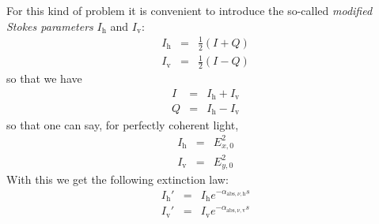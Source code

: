 \documentclass{report}
\begin{document}
For this kind of problem it is convenient to introduce the so-called {\em
  modified Stokes parameters} $I_{\mathrm{h}}$ and $I_{\mathrm{v}}$:
\begin{eqnarray}
I_{\mathrm{h}} &=& \frac{1}{2}(I+Q)\label{eq-modif-stokes-h}\\
I_{\mathrm{v}} &=& \frac{1}{2}(I-Q)\label{eq-modif-stokes-v}
\end{eqnarray}
so that we have 
\begin{eqnarray}
I &=& I_{\mathrm{h}}+I_{\mathrm{v}}\\
Q &=& I_{\mathrm{h}}-I_{\mathrm{v}}
\end{eqnarray}
so that one can say, for perfectly coherent light,
\begin{eqnarray}
I_{\mathrm{h}} &=& E_{x,0}^2\\
I_{\mathrm{v}} &=& E_{y,0}^2
\end{eqnarray}
With this we get the following extinction law:
\begin{eqnarray}
I_{\mathrm{h}}' &=& I_{\mathrm{h}} e^{-\alpha_{\mathrm{abs},\nu,\mathrm{h}}s}\\
I_{\mathrm{v}}' &=& I_{\mathrm{v}} e^{-\alpha_{\mathrm{abs},\nu,\mathrm{v}}s}
\end{eqnarray}
\end{document}
